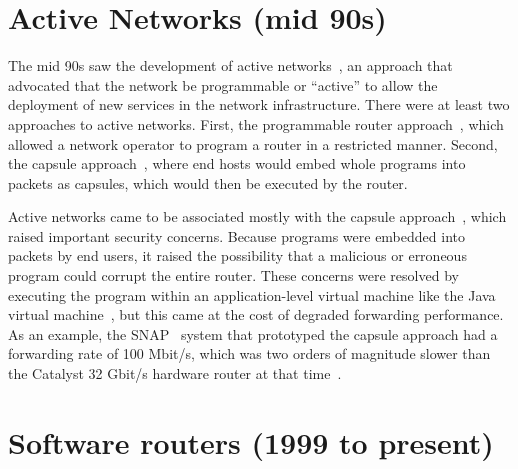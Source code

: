 \section{Active Networks (mid 90s)}
The mid 90s saw the development of active networks~\cite{ants, switchware}, an
approach that advocated that the network be programmable or ``active'' to allow
the deployment of new services in the network infrastructure. There were at
least two approaches to active networks. First, the programmable router
approach~\cite{switchware}, which allowed a network operator to program a
router in a restricted manner. Second, the capsule approach~\cite{ants}, where
end hosts would embed whole programs into packets as capsules, which would then
be executed by the router.

Active networks came to be associated mostly with the capsule
approach~\cite{sdn_history}, which raised important security concerns. Because
programs were embedded into packets by end users, it raised the possibility
that a malicious or erroneous program could corrupt the entire router. These
concerns were resolved by executing the program within an application-level
virtual machine like the Java virtual machine~\cite{ants}, but this came at the
cost of degraded forwarding performance. As an example, the SNAP~\cite{snap}
system that prototyped the capsule approach had a forwarding rate of 100
Mbit/s, which was two orders of magnitude slower than the Catalyst 32 Gbit/s
hardware router at that time~\cite{catalyst}.


\section{Software routers (1999 to present)}


